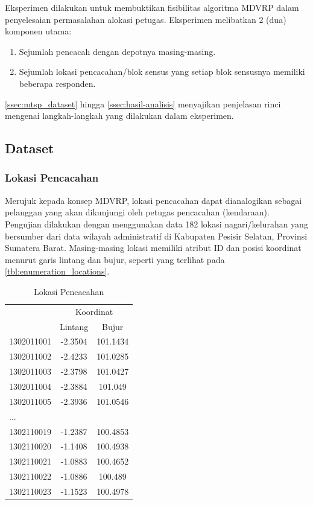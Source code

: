 Eksperimen dilakukan untuk membuktikan fisibilitas algoritma MDVRP dalam penyelesaian permasalahan alokasi petugas. Eksperimen melibatkan 2 (dua) komponen utama:
\begin{enumerate}
	\item Sejumlah pencacah dengan depotnya masing-masing. 
	\item Sejumlah lokasi pencacahan/blok sensus yang setiap blok sensusnya memiliki beberapa responden. 
\end{enumerate}

\autoref{ssec:mtsp_dataset} hingga \autoref{ssec:hasil-analisis} menyajikan penjelasan rinci mengenai langkah-langkah yang dilakukan dalam eksperimen. 

\subsection{Dataset}
\label{ssec:mtsp_dataset}
\subsubsection{Lokasi Pencacahan}
Merujuk kepada konsep MDVRP, lokasi pencacahan dapat dianalogikan sebagai pelanggan yang akan dikunjungi oleh petugas pencacahan (kendaraan). Pengujian dilakukan dengan menggunakan data 182 lokasi nagari/kelurahan yang bersumber dari data wilayah administratif di Kabupaten Pesisir Selatan, Provinsi Sumatera Barat. Masing-masing lokasi memiliki atribut ID dan posisi koordinat menurut garis lintang dan bujur, seperti yang terlihat pada \autoref{tbl:enumeration_locations}.


\begin{table}[!]
	\centering
	\captionsetup{format=hang}
	\caption{Lokasi Pencacahan}
	\label{tbl:enumeration_locations}
	\begin{tabular}{lcc}
		\toprule
		& \multicolumn{2}{c}{Koordinat}\\
		\cmidrule{2-3}
		& Lintang & Bujur\\ 
		\midrule
		1302011001 & -2.3504 & 101.1434\\ 
		1302011002 & -2.4233 & 101.0285\\ 
		1302011003 & -2.3798 & 101.0427\\ 
		1302011004 & -2.3884 & 101.049\\ 
		1302011005 & -2.3936 & 101.0546\\
		...\\
		1302110019 & -1.2387 & 100.4853\\ 
		1302110020 & -1.1408 & 100.4938\\ 
		1302110021 & -1.0883 & 100.4652\\ 
		1302110022 & -1.0886 & 100.489\\ 
		1302110023 & -1.1523 & 100.4978\\
		\bottomrule
	\end{tabular}
\end{table}


